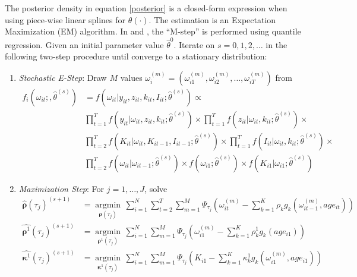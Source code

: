 \documentclass{article}
\begin{document}
The posterior density in equation \eqref{posterior} is a closed-form expression when using piece-wise linear splines for $\theta(\cdot)$. The estimation is an Expectation Maximization (EM) algorithm. In \cite{Arellano2016} and \cite{Arellano2017}, the ``M-step'' is performed using quantile regression. Given an initial parameter value $\hat{\theta}^{0}$. Iterate on $s=0,1,2,\dots$ in the following two-step procedure until converge to a stationary distribution:

\begin{enumerate}
    \item \textit{Stochastic E-Step}: Draw $M$ values $\omega_{i}^{(m)}=(\omega_{i1}^{(m)}, \omega_{i2}^{(m)},\dots, \omega_{iT}^{(m)})$ from
        \begin{equation*}
        \begin{split}
            f_{i}(\omega_{it};,\hat{\theta}^{(s)})&=f(\omega_{it}|y_{it}, z_{it}, k_{it}, I_{it}; \hat{\theta}^{(s)}) \propto\\
            &\prod_{t=1}^{T}f(y_{it}|\omega_{it}, z_{it}, k_{it};\hat{\theta}^{(s)})\times
            \prod_{t=1}^{T}f(z_{it}|\omega_{it}, k_{it};\hat{\theta}^{(s)})\times\\
            &\prod_{t=2}^{T}f(K_{it}|\omega_{it}, K_{it-1}, I_{it-1};\hat{\theta}^{(s)})\times \prod_{t=1}^{T}f(I_{it}|\omega_{it}, k_{it}; \hat{\theta}^{(s)})\times \\
            &\prod_{t=2}^{T}f(\omega_{it}|\omega_{it-1};\hat{\theta}^{(s)})\times f(\omega_{i1};\hat{\theta}^{(s)})\times f(K_{i1}|\omega_{i1};\hat{\theta}^{(s)})
            \end{split}
        \end{equation*}
    \item \textit{Maximization Step}: For $j=1,\dots, J$, solve
    \begin{equation*}
    \begin{split}
    \hat{\boldsymbol\rho}(\tau_{j})^{(s+1)}&=\underset{\boldsymbol\rho(\tau_{j})}{\operatorname{argmin}}\,\sum_{i=1}^{N}\sum_{t=2}^{T}\sum_{m=1}^{M}\Psi_{\tau_{j}}(\omega_{it}^{(m)}-\sum_{k=1}^{K}\rho_{k}g_{k}(\omega_{it-1}^{(m)}, age_{it}))\\
    \hat{\boldsymbol\rho^{1}}(\tau_{j})^{(s+1)}&=\underset{\boldsymbol\rho^{1}(\tau_{j})}{\operatorname{argmin}}\,\sum_{i=1}^{N}\sum_{m=1}^{M}\Psi_{\tau_{j}}(\omega_{i1}^{(m)}-\sum_{k=1}^{K}\rho_{k}^{1}g_{k}(age_{i1}))\\
    \hat{\boldsymbol\kappa^{1}}(\tau_{j})^{(s+1)}&=\underset{\boldsymbol\kappa^{1}(\tau_{j})}{\operatorname{argmin}}\,\sum_{i=1}^{N}\sum_{m=1}^{M}\Psi_{\tau_{j}}(K_{i1}-\sum_{k=1}^{K}\kappa_{k}^{1}g_{k}(\omega_{i1}^{(m)}, age_{i1}))\\
    \end{split}
    \end{equation*}
    

\end{enumerate}
\end{document}
